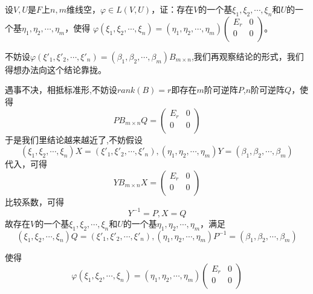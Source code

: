 \documentclass[lang=cn,10pt]{elegantbook}
\begin{document}
\begin{example}
	设$V,U$是$F$上$n,m$维线空，$\varphi\in L(V,U)$，证：存在$V$的一个基$\xi_1,\xi_2,\cdots,\xi_n$和$U$的一个基$\eta_1,\eta_2,\cdots,\eta_m$，使得
	$\varphi(\xi_1,\xi_2,\cdots,\xi_n)=(\eta_1,\eta_2,\cdots,\eta_m)\left(\begin{matrix}E_r&0\\0&0\\\end{matrix}\right)$。
\end{example}
\begin{solution}
	
	不妨设$\varphi(\xi'_1,\xi'_2,\cdots,\xi'_n)=(\beta _1,\beta _2,\cdots ,\beta _m)B_{m\times n}$,我们再观察结论的形式，我们得想办法向这个结论靠拢。
	
	遇事不决，相抵标准形,不妨设$rank(B)=r$即存在$m$阶可逆阵$P$,$n$阶可逆阵$Q$，使得
	\begin{equation*}
		PB_{m\times n}Q=\left(\begin{matrix}E_r&0\\0&0\\\end{matrix}\right)
	\end{equation*}
	于是我们里结论越来越近了,不妨假设
	\begin{equation*}
		(\xi_1,\xi_2,\cdots,\xi_n)X=(\xi'_1,\xi'_2,\cdots,\xi'_n),(\eta_1,\eta_2,\cdots,\eta_m)Y=(\beta _1,\beta _2,\cdots ,\beta _m)
	\end{equation*}
	代入，可得
	\begin{equation*}
		YB_{m\times n}X=\left(\begin{matrix}E_r&0\\0&0\\\end{matrix}\right)
	\end{equation*}
	比较系数，可得
	\begin{equation*}
		Y^{-1}=P,X=Q
	\end{equation*}
	故存在$V$的一个基$\xi_1,\xi_2,\cdots,\xi_n$和$U$的一个基$\eta_1,\eta_2,\cdots,\eta_m$，满足
	\begin{equation*}
		(\xi_1,\xi_2,\cdots,\xi_n)Q=(\xi'_1,\xi'_2,\cdots,\xi'_n),(\eta_1,\eta_2,\cdots,\eta_m)P^{-1}=(\beta _1,\beta _2,\cdots ,\beta _m)
	\end{equation*}
\end{solution}
使得
\begin{equation*}
	\varphi(\xi_1,\xi_2,\cdots,\xi_n)=(\eta_1,\eta_2,\cdots,\eta_m)\left(\begin{matrix}E_r&0\\0&0\\\end{matrix}\right)
\end{equation*}
\end{document}
